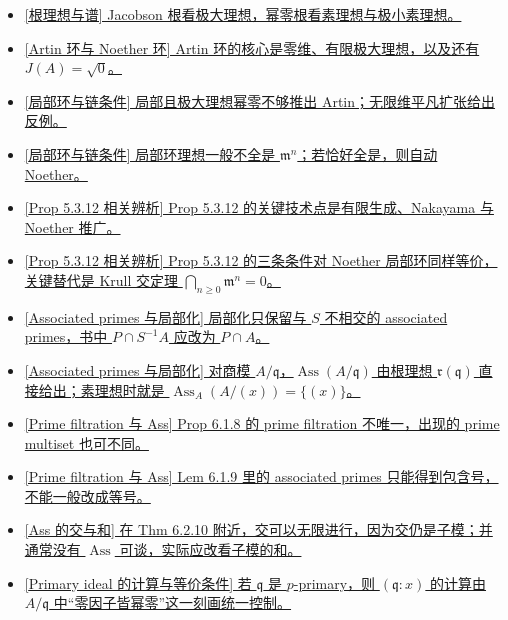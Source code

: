 \documentclass[a4paper]{ctexart}
\theoremstyle{definition}
\theoremstyle{analysis}
\theoremstyle{plain}
\begin{document}
\begin{itemize}
  \item \hyperref[subsec:radicals-spectrum]{[根理想与谱] Jacobson 根看极大理想，幂零根看素理想与极小素理想。}
  \item \hyperref[subsec:artin-noether]{[Artin 环与 Noether 环] Artin 环的核心是零维、有限极大理想，以及还有 \(J(A)=\sqrt{0}\)。}
  \item \hyperref[rem:local-chain-counterexample]{[\hyperref[subsec:local-chain]{局部环与链条件}] 局部且极大理想幂零不够推出 Artin；无限维平凡扩张给出反例。}
  \item \hyperref[rem:local-chain-noether]{[\hyperref[subsec:local-chain]{局部环与链条件}] 局部环理想一般不全是 \(\mathfrak m^n\)；若恰好全是，则自动 Noether。}
  \item \hyperref[rem:prop5312-nakayama]{[\hyperref[subsec:prop5312]{Prop 5.3.12 相关辨析}] Prop 5.3.12 的关键技术点是有限生成、Nakayama 与 Noether 推广。}
  \item \hyperref[rem:prop5312-noether]{[\hyperref[subsec:prop5312]{Prop 5.3.12 相关辨析}] Prop 5.3.12 的三条条件对 Noether 局部环同样等价，关键替代是 Krull 交定理 \(\bigcap_{n\ge 0}\mathfrak m^n=0\)。}
  \item \hyperref[rem:ass-localization-formula]{[\hyperref[subsec:ass-localization]{Associated primes 与局部化}] 局部化只保留与 \(S\) 不相交的 associated primes，书中 \(P\cap S^{-1}A\) 应改为 \(P\cap A\)。}
  \item \hyperref[rem:ass-quotient-radical]{[\hyperref[subsec:ass-localization]{Associated primes 与局部化}] 对商模 \(A/\mathfrak q\)，\(\operatorname{Ass}(A/\mathfrak q)\) 由根理想 \(\mathfrak r(\mathfrak q)\) 直接给出；素理想时就是 \(\operatorname{Ass}_A(A/(x))=\{(x)\}\)。}
  \item \hyperref[rem:prime-filtration-nonunique]{[Prime filtration 与 Ass] Prop 6.1.8 的 prime filtration 不唯一，出现的 prime multiset 也可不同。}
  \item \hyperref[rem:ass-short-exact-strict]{[Prime filtration 与 Ass] Lem 6.1.9 里的 associated primes 只能得到包含号，不能一般改成等号。}
  \item \hyperref[rem:ass-intersection-sum]{[Ass 的交与和] 在 Thm 6.2.10 附近，交可以无限进行，因为交仍是子模；并通常没有 \(\operatorname{Ass}\) 可谈，实际应改看子模的和。}
  \item \hyperref[rem:primary-colon]{[\hyperref[subsec:primary-ideal-colon]{Primary ideal 的计算与等价条件}] 若 \(\mathfrak q\) 是 \(p\)-primary，则 \((\mathfrak q:x)\) 的计算由 \(A/\mathfrak q\) 中“零因子皆幂零”这一刻画统一控制。}

\end{itemize}
\end{document}
